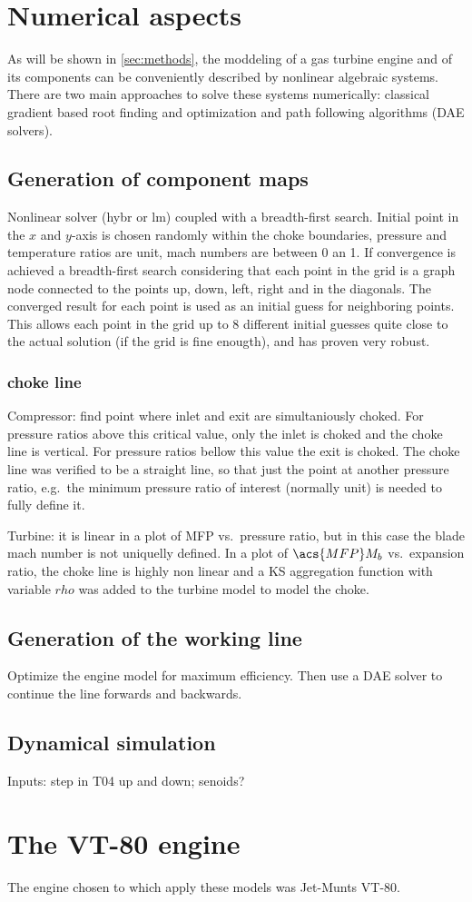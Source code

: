 \documentclass[tcc]{subfiles}
\begin{document}
\section{Numerical aspects}
As will be shown in \cref{sec:methods}, 
the moddeling of a gas turbine engine and of its components can 
be conveniently described by nonlinear algebraic systems. 
There are two main approaches to solve these systems numerically: 
classical gradient based root finding and optimization 
and path following algorithms (\ac{DAE} solvers).

\subsection{Generation of component maps}
Nonlinear solver (hybr or lm) coupled with a breadth-first search. Initial point in the $x$ and $y$-axis is chosen randomly within the choke boundaries, pressure and temperature ratios are unit, mach numbers are between 0 an 1. If convergence is achieved a breadth-first search considering that each point in the grid is a graph node connected to the points up, down, left, right and in the diagonals. The converged result for each point is used as an initial guess for neighboring points. This allows each point in the grid up to 8 different initial guesses quite close to the actual solution (if the grid is fine enougth), and has proven very robust. 

\subsubsection*{choke line}
Compressor: find point where inlet and exit are simultaniously choked. For pressure ratios above this critical value, only the inlet is choked and the choke line is vertical. For pressure ratios bellow this value the exit is choked. The choke line was verified to be a straight line, so that just the point at another pressure ratio, e.g.\ the minimum pressure ratio of interest (normally unit) is needed to fully define it.

Turbine: it is linear in a plot of \acs{MFP} vs.\ pressure ratio, but in this case the blade mach number is not uniquelly defined. In a plot of $\acs{MFP}M_b$ vs.\ expansion ratio, the choke line is highly non linear and a KS aggregation function with variable $rho$ was added to the turbine model to model the choke.  

\subsection{Generation of the working line}
Optimize the engine model for maximum efficiency. 
Then use a \ac{DAE} solver to continue the line forwards and backwards.

\subsection{Dynamical simulation}
Inputs: step in T04 up and down; senoids?

\section{The VT-80 engine}
The engine chosen to which apply these models was Jet-Munts VT-80.
\end{document}
